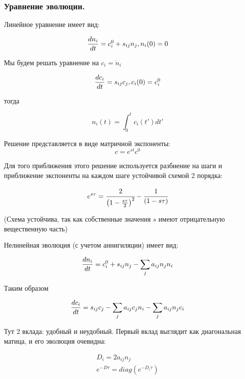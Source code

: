 	
	\subsubsection{Уравнение эволюции.}
	
	Линейное уравнение имеет вид:
	
\begin{equation*}
	\frac{d n_i}{d t} = c^0_i + s_{ij} n_j, n_i(0) = 0
\end{equation*}

Мы будем решать уравнение на $c_i = \dot{n}_i$


\begin{equation*}
	\frac{d c_i}{d t} = s_{ij} c_j, c_i(0) = c^0_i
\end{equation*}

тогда 

\begin{equation*}
	n_i(t) = \int_0^t{c_i(t')dt'}
\end{equation*}

Решение представляется в виде матричной экспоненты:
\begin{equation*}
	c = e^{s t} c^0
\end{equation*}

Для того приближения этого решение используется разбиение на шаги и приближение экспоненты на каждом шаге устойчивой схемой 2 порядка:

\begin{equation*}
	e^{s \tau} = \cfrac{2}{\left(1-\frac{s \tau}{2}\right)^2}-\cfrac{1}{(1-s \tau)}
\end{equation*}

(Схема устойчива, так как собственные значения $s$ имеют отрицательную вещественную часть)



Нелинейная эволюция (с учетом аннигиляции) имеет вид:

\begin{equation*}
	\frac{d n_i}{d t} = c^0_i + s_{ij} n_j - \sum_j{a_{ij} n_j n_i}
\end{equation*}

Таким образом 

\begin{equation*}
	\frac{d c_i}{d t} = s_{ij} c_j  - \sum_j {a_{ij} c_j n_i} - \sum_j{a_{ij} n_j c_i}
\end{equation*}

Тут 2 вклада: удобный и неудобный. Первый вклад выглядит как диагональная матица, и его эволюция очевидна:

\begin{eqnarray*}
	D_i = 2 a_{ij} n_j \\
	e^{-D \tau} = diag ( e^{-D_i \tau} )
\end{eqnarray*}

